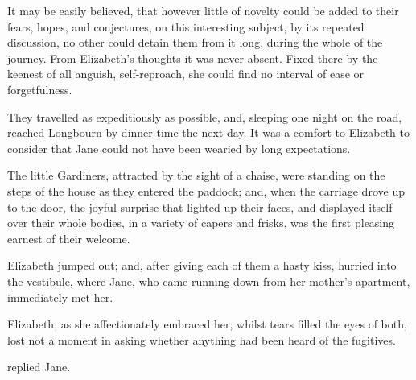 It may be easily believed, that however little of novelty could be added to their fears, hopes, and conjectures, on this interesting subject, by its repeated discussion, no other could detain them from it long, during the whole of the journey. From Elizabeth's thoughts it was never absent. Fixed there by the keenest of all anguish, self-reproach, she could find no interval of ease or forgetfulness.

They travelled as expeditiously as possible, and, sleeping one night on the road, reached Longbourn by dinner time the next day. It was a comfort to Elizabeth to consider that Jane could not have been wearied by long expectations.

The little Gardiners, attracted by the sight of a chaise, were standing on the steps of the house as they entered the paddock; and, when the carriage drove up to the door, the joyful surprise that lighted up their faces, and displayed itself over their whole bodies, in a variety of capers and frisks, was the first pleasing earnest of their welcome.

Elizabeth jumped out; and, after giving each of them a hasty kiss, hurried into the vestibule, where Jane, who came running down from her mother's apartment, immediately met her.

Elizabeth, as she affectionately embraced her, whilst tears filled the eyes of both, lost not a moment in asking whether anything had been heard of the fugitives.

 replied Jane. 







